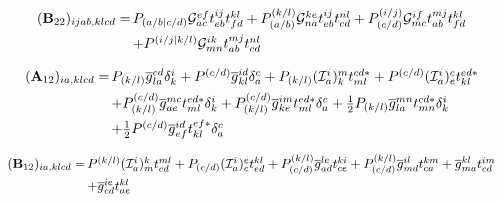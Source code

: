 \begin{subappendices}
    \begin{equation}
        \begin{array}{r@{\,}l}
            (\mathbf{B}_{22})_{ijab,klcd}
            =
            &
            P_{(a/b|c/d)}
            \mathcal{G}_{ac}^{ef}
            t_{eb}^{ij}
            t_{fd}^{kl}
            +
            P_{(a/b)}^{(k/l)}
            \mathcal{G}_{na}^{ke}
            t_{eb}^{ij}
            t_{cd}^{nl}
            +
            P_{(c/d)}^{(i/j)}
            \mathcal{G}_{mc}^{if}
            t_{ab}^{mj}
            t_{fd}^{kl}
            \\[5pt]
            &
            +
            P^{(i/j|k/l)}
            \mathcal{G}_{mn}^{ik}
            t_{ab}^{mj}
            t_{cd}^{nl}
        \end{array}
    \end{equation}

    \begin{equation}
        \begin{array}{r@{\,}l}
            (\mathbf{A}_{12})_{ia,klcd}
            =
            &
            P_{(k/l)}
            \overline{g}_{la}^{cd}
            \delta_k^i
            +
            P^{(c/d)}
            \overline{g}_{kl}^{id}
            \delta_a^c
            +
            P_{(k/l)}
            (\mathcal{I}_a^i)_k^m
            t_{ml}^{cd*}
            +
            P^{(c/d)}
            (\mathcal{I}_a^i)_e^c
            t_{kl}^{ed*}
            \\[5pt]
            &
            +
            P_{(k/l)}^{(c/d)}
            \overline{g}_{ae}^{mc}
            t_{ml}^{ed*}
            \delta_k^i
            +
            P_{(k/l)}^{(c/d)}
            \overline{g}_{ke}^{im}
            t_{ml}^{ed*}
            \delta_a^c
            +
            \tfrac{1}{2}
            P_{(k/l)}
            \overline{g}_{la}^{mn}
            t_{mn}^{cd*}
            \delta_k^i
            \\[5pt]
            &
            +
            \tfrac{1}{2}
            P^{(c/d)}
            \overline{g}_{ef}^{id}
            t_{kl}^{ef*}
            \delta_a^c
        \end{array}
    \end{equation}

    \begin{equation}
        \begin{array}{r@{\,}l}
            (\mathbf{B}_{12})_{ia,klcd}
            =
            &
            P^{(k/l)}
            (\mathcal{I}_a^i)_m^k
            t_{cd}^{ml}
            +
            P_{(c/d)}
            (\mathcal{I}_a^i)_c^e
            t_{ed}^{kl}
            +
            P_{(c/d)}^{(k/l)}
            \overline{g}_{ad}^{le}
            t_{ce}^{ki}
            +
            P_{(c/d)}^{(k/l)}
            \overline{g}_{md}^{il}
            t_{ca}^{km}
            +
            \overline{g}_{ma}^{kl}
            t_{cd}^{im}
            \\[5pt]
            &
            +
            \overline{g}_{cd}^{ie}
            t_{ae}^{kl}
        \end{array}
    \end{equation}


\end{subappendices}
